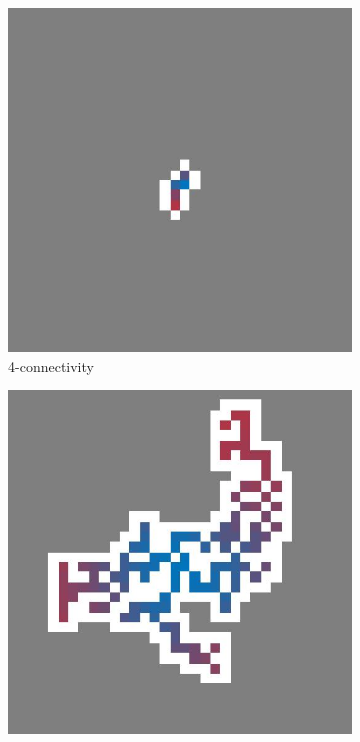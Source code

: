 \begin{figure}%
	\centering
	\begin{subfigure}{0.45\columnwidth}
		\centering
		\includegraphics[width=\textwidth]{img/assignment_connectivity_four_N80_p3.jpeg}
		\caption{4-connectivity}
		\label{fig:exp:connectivity:fourConnect}
	\end{subfigure}
	\begin{subfigure}{0.45\columnwidth}
		\centering
		\includegraphics[width=\textwidth]{img/assignment_connectivity_eight_N80_p3.jpeg}

\end{subfigure}
\end{figure}
